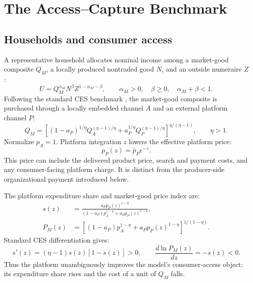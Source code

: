 \documentclass[11pt]{article}
\theoremstyle{definition}
\theoremstyle{remark}
\begin{document}
\section{The Access--Capture Benchmark}

\subsection{Households and consumer access}

A representative household allocates nominal income among a market-good
composite \(Q_M\), a locally produced nontraded good \(N\), and an outside
numeraire \(Z\):
\begin{equation}
 U=Q_M^{\alpha_M}N^\beta Z^{1-\alpha_M-\beta},
 \qquad
 \alpha_M>0,\quad \beta\geq0,\quad \alpha_M+\beta<1.
 \label{eq:utility}
\end{equation}
Following the standard CES benchmark \citep{DixitStiglitz1977}, the market-good
composite is purchased through a locally embedded channel
\(A\) and an external platform channel \(P\):
\begin{equation}
 Q_M=
 \left[
 (1-a_P)^{1/\eta}Q_A^{(\eta-1)/\eta}
 +a_P^{1/\eta}Q_P^{(\eta-1)/\eta}
 \right]^{\eta/(\eta-1)},
 \qquad \eta>1.
 \label{eq:consumer_ces}
\end{equation}
Normalize \(p_A=1\).  Platform integration \(z\) lowers the effective platform
price:
\begin{equation}
 p_P(z)=\bar p_Pe^{-z}.
 \label{eq:platform_price}
\end{equation}
This price can include the delivered product price, search and payment costs,
and any consumer-facing platform charge.  It is distinct from the
producer-side organizational payment introduced below.

The platform expenditure share and market-good price index are:
\begin{align}
 s(z)
 &=
 \frac{a_Pp_P(z)^{1-\eta}}
 {(1-a_P)p_A^{1-\eta}+a_Pp_P(z)^{1-\eta}},
 \label{eq:platform_share}\\
 P_M(z)
 &=
 \left[
 (1-a_P)p_A^{1-\eta}
 +a_Pp_P(z)^{1-\eta}
 \right]^{1/(1-\eta)}.
 \label{eq:price_index}
\end{align}
Standard CES differentiation gives:
\begin{equation}
 s'(z)=(\eta-1)s(z)[1-s(z)]>0,
 \qquad
 \frac{d\ln P_M(z)}{dz}=-s(z)<0.
 \label{eq:consumer_comparative_static}
\end{equation}
Thus the platform unambiguously improves the model's consumer-access object:
its expenditure share rises and the cost of a unit of \(Q_M\) falls.
\end{document}
